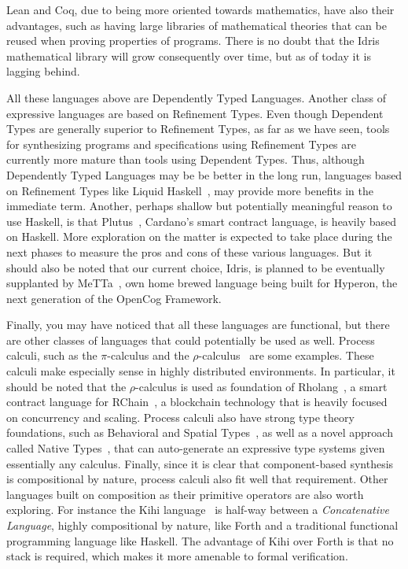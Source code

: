 \documentclass[]{report}
\begin{document}
Lean and Coq, due to being more oriented towards mathematics, have
also their advantages, such as having large libraries of mathematical
theories that can be reused when proving properties of programs.
There is no doubt that the Idris mathematical library will grow
consequently over time, but as of today it is lagging behind.

All these languages above are Dependently Typed Languages.  Another
class of expressive languages are based on Refinement Types.  Even
though Dependent Types are generally superior to Refinement Types, as
far as we have seen, tools for synthesizing programs and
specifications using Refinement Types are currently more mature than
tools using Dependent Types.  Thus, although Dependently Typed
Languages may be be better in the long run, languages based on
Refinement Types like Liquid Haskell~\cite{Vazou2014}, may provide
more benefits in the immediate term.  Another, perhaps shallow but
potentially meaningful reason to use Haskell, is that
Plutus~\cite{Plutus2022}, Cardano's smart contract language, is
heavily based on Haskell.  More exploration on the matter is expected
to take place during the next phases to measure the pros and cons of
these various languages.  But it should also be noted that our current
choice, Idris, is planned to be eventually supplanted by
MeTTa~\cite{Warrell2022}, own home brewed language being built for
Hyperon, the next generation of the OpenCog Framework.

Finally, you may have noticed that all these languages are functional,
but there are other classes of languages that could potentially be
used as well.  Process calculi, such as the $\pi$-calculus and the
$\rho$-calculus~\cite{Meredith2005} are some examples.  These calculi
make especially sense in highly distributed environments.  In
particular, it should be noted that the $\rho$-calculus is used as
foundation of Rholang~\cite{Rholang2021}, a smart contract language
for RChain~\cite{RChain2021}, a blockchain technology that is heavily
focused on concurrency and scaling.  Process calculi also have strong
type theory foundations, such as Behavioral and Spatial
Types~\cite{Caires2004}, as well as a novel approach called Native
Types~\cite{Williams2021}, that can auto-generate an expressive type
systems given essentially any calculus.  Finally, since it is clear
that component-based synthesis is compositional by nature, process
calculi also fit well that requirement.  Other languages built on
composition as their primitive operators are also worth exploring.
For instance the Kihi language~\cite{Timothy2018} is half-way between
a \emph{Concatenative Language}, highly compositional by nature, like
Forth and a traditional functional programming language like Haskell.
The advantage of Kihi over Forth is that no stack is required, which
makes it more amenable to formal verification.
\end{document}
